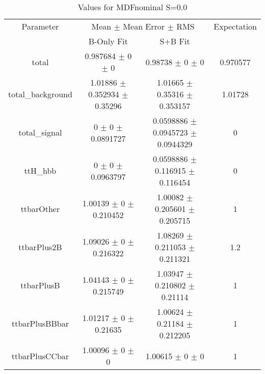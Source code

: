 \begin{table}
\centering
\caption{Values for MDFnominal S=0.0}
\begin{tabular}{cccc}
\toprule
Parameter & \multicolumn{2}{c}{Mean $\pm$ Mean Error $\pm$ RMS} & Expectation\\
 & B-Only Fit & S+B Fit & \\
\midrule
total & \num{0.987684} $\pm$ \num{0} $\pm$ \num{0} & \num{0.98738} $\pm$ \num{0} $\pm$ \num{0} & \num{0.970577}\\
total\_background & \num{1.01886} $\pm$ \num{0.352934} $\pm$ \num{0.35296} & \num{1.01665} $\pm$ \num{0.35316} $\pm$ \num{0.353157} & \num{1.01728}\\
total\_signal & \num{0} $\pm$ \num{0} $\pm$ \num{0.0891727} & \num{0.0598886} $\pm$ \num{0.0945723} $\pm$ \num{0.0944329} & \num{0}\\
ttH\_hbb & \num{0} $\pm$ \num{0} $\pm$ \num{0.0963797} & \num{0.0598886} $\pm$ \num{0.116915} $\pm$ \num{0.116454} & \num{0}\\
ttbarOther & \num{1.00139} $\pm$ \num{0} $\pm$ \num{0.210452} & \num{1.00082} $\pm$ \num{0.205601} $\pm$ \num{0.205715} & \num{1}\\
ttbarPlus2B & \num{1.09026} $\pm$ \num{0} $\pm$ \num{0.216322} & \num{1.08269} $\pm$ \num{0.211053} $\pm$ \num{0.211321} & \num{1.2}\\
ttbarPlusB & \num{1.04143} $\pm$ \num{0} $\pm$ \num{0.215749} & \num{1.03947} $\pm$ \num{0.210802} $\pm$ \num{0.21114} & \num{1}\\
ttbarPlusBBbar & \num{1.01217} $\pm$ \num{0} $\pm$ \num{0.21635} & \num{1.00624} $\pm$ \num{0.21184} $\pm$ \num{0.212205} & \num{1}\\
ttbarPlusCCbar & \num{1.00096} $\pm$ \num{0} $\pm$ \num{0} & \num{1.00615} $\pm$ \num{0} $\pm$ \num{0} & \num{1}\\
\bottomrule
\end{tabular}
\end{table}